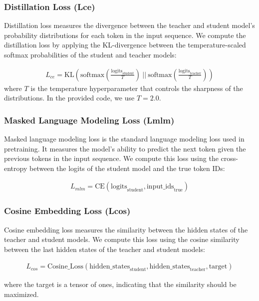 \documentclass[letterpaper]{article}
\begin{document}
\subsubsection{Distillation Loss (Lce)}
Distillation loss measures the divergence between the teacher and student model's probability distributions for each token in the input sequence. We compute the distillation loss by applying the KL-divergence between the temperature-scaled softmax probabilities of the student and teacher models:

\begin{align}
L_{ce} = \text{KL} \left( \text{softmax}\left(\frac{\text{logits}_{\text{student}}}{T}\right) \ || \ \text{softmax}\left(\frac{\text{logits}_{\text{teacher}}}{T}\right) \right)
\end{align}
where $T$ is the temperature hyperparameter that controls the sharpness of the distributions. In the provided code, we use $T=2.0$.

\subsubsection{Masked Language Modeling Loss (Lmlm)}
Masked language modeling loss is the standard language modeling loss used in pretraining. It measures the model's ability to predict the next token given the previous tokens in the input sequence. We compute this loss using the cross-entropy between the logits of the student model and the true token IDs:

\begin{align}
L_{mlm} = \text{CE} \left( \text{logits}_{\text{student}}, \text{input\_ids}_{\text{true}} \right)
\end{align}

\subsubsection{Cosine Embedding Loss (Lcos)}
Cosine embedding loss measures the similarity between the hidden states of the teacher and student models. We compute this loss using the cosine similarity between the last hidden states of the teacher and student models:

\begin{align}
L_{cos} = \text{Cosine\_Loss} \left( \text{hidden\_states}_{\text{student}}, \text{hidden\_states}_{\text{teacher}}, \text{target} \right)
\end{align}

where the target is a tensor of ones, indicating that the similarity should be maximized.
\end{document}
